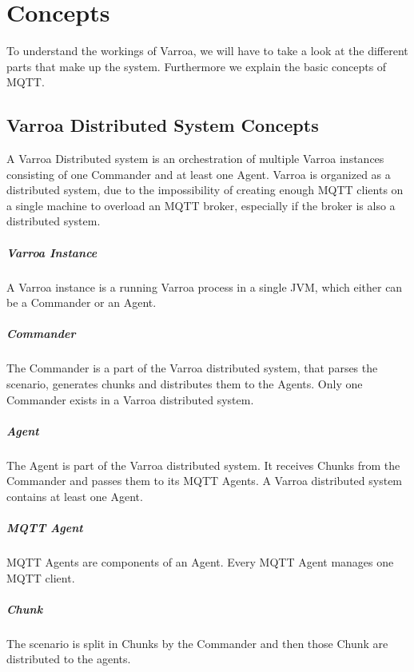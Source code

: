 \chapter{Concepts}
To understand the workings of Varroa, we will have to take a look at the different parts that make up the system.
Furthermore we explain the basic concepts of MQTT.

\section{Varroa Distributed System Concepts}
A Varroa Distributed system is an orchestration of multiple Varroa instances consisting of one Commander and at least one Agent.
Varroa is organized as a distributed system, due to the impossibility of creating enough MQTT clients on a single machine to overload an MQTT broker, especially if the broker is also a distributed system.

\paragraph{Varroa Instance}
A Varroa instance is a running Varroa process in a single JVM, which either can be a Commander or an Agent.

\paragraph{Commander}
The Commander is a part of the Varroa distributed system, that parses the scenario, generates chunks and distributes them to the Agents.
Only one Commander exists in a Varroa distributed system.

\paragraph{Agent}
The Agent is part of the Varroa distributed system.
It receives Chunks from the Commander and passes them to its MQTT Agents.
A Varroa distributed system contains at least one Agent.

\paragraph{MQTT Agent}
MQTT Agents are components of an Agent.
Every MQTT Agent manages one MQTT client.

\paragraph{Chunk}
The scenario is split in Chunks by the Commander and then those Chunk are distributed to the agents.

